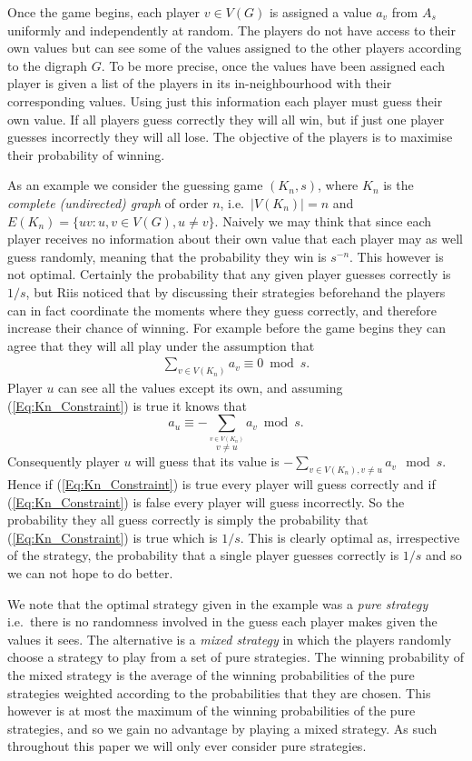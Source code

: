 \documentclass[a4paper, 14pt]{extarticle}
\theoremstyle{plain}
\begin{document}
Once the game begins, each player $v\in V(G)$ is
assigned a value $a_v$ from $A_s$ uniformly and independently at random. The players
do not have access to their own values but can see some of the values
assigned to the other players according to the digraph $G$. To be more
precise, once the values have been assigned each player is given a
list of the players in its in-neighbourhood with their corresponding
values. Using just this information each player must guess their own
value. If all players guess correctly they will all win, but if just one
player guesses incorrectly they will all lose. The objective of the
players is to maximise their probability of winning.

As an example we consider the guessing game $(K_n,s)$, where $K_n$
is the \emph{complete (undirected) graph} of order $n$, i.e.\ $|V(K_n)|=n$ and
$E(K_n)=\{uv : u,v\in V(G), u\neq v\}$. Naively we may think that
since each player receives no information about their own value that
each player may as well guess randomly, meaning that the probability
they win is $s^{-n}$. This however is not optimal. Certainly the
probability that any given player guesses correctly is $1/s$, but Riis \cite{Riis07} noticed that by
discussing their strategies beforehand the players can in fact coordinate the moments where
they guess correctly, and therefore increase their chance of winning. For example before the game begins they can
agree that they will all play under the assumption that
\begin{align}\label{Eq:Kn_Constraint}
\sum_{v\in V(K_n)} a_v \equiv 0\bmod s.
\end{align}
Player $u$ can see all the values except its own, and assuming
(\ref{Eq:Kn_Constraint}) is true it knows that
\[
a_u \equiv -\sum_{\stackrel{v\in V(K_n)}{v\neq u}} a_v\bmod s.
\]
Consequently player $u$ will guess that its value is $-\sum_{v\in V(K_n),
v\neq u} a_v\mod s$. Hence if (\ref{Eq:Kn_Constraint}) is true every
player will guess correctly and if (\ref{Eq:Kn_Constraint}) is
false every player will guess incorrectly. So the probability they all
guess correctly is simply the probability that (\ref{Eq:Kn_Constraint}) is true
which is $1/s$. This is clearly optimal as, irrespective of the
strategy, the probability that a single player guesses correctly is
$1/s$ and so we can not hope to do better.

We note that the optimal strategy given in the example was a
\emph{pure strategy} i.e.\ there is no randomness involved in the guess
each player makes given the values it sees. The alternative is a \emph{mixed strategy} in which the players randomly choose a strategy to play from a set of pure strategies. The winning probability of the mixed strategy is the average of the winning probabilities of the pure strategies weighted according to the probabilities that they are chosen. This however is at most the maximum of the winning probabilities of the pure strategies, and so we gain no advantage by playing a mixed strategy. As such throughout this paper we will only ever consider pure strategies.
\end{document}
